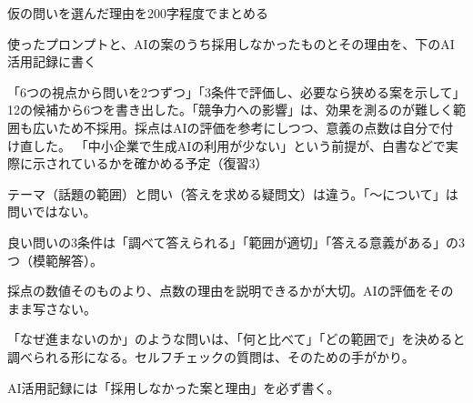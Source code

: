 \begin{nexttime}
  \item 仮の問いを選んだ理由を200字程度でまとめる
  \item 使ったプロンプトと、AIの案のうち採用しなかったものとその理由を、下のAI活用記録に書く
\end{nexttime}
{「6つの視点から問いを2つずつ」「3条件で評価し、必要なら狭める案を示して」}
{12の候補から6つを書き出した。「競争力への影響」は、効果を測るのが難しく範囲も広いため不採用。採点はAIの評価を参考にしつつ、意義の点数は自分で付け直した。}
{「中小企業で生成AIの利用が少ない」という前提が、白書などで実際に示されているかを確かめる予定（復習3）}

\begin{point}
  \item テーマ（話題の範囲）と問い（答えを求める疑問文）は違う。「〜について」は問いではない。
  \item 良い問いの3条件は「調べて答えられる」「範囲が適切」「答える意義がある」の3つ（模範解答）。
  \item 採点の数値そのものより、点数の理由を説明できるかが大切。AIの評価をそのまま写さない。
  \item 「なぜ進まないのか」のような問いは、「何と比べて」「どの範囲で」を決めると調べられる形になる。セルフチェックの質問は、そのための手がかり。
  \item AI活用記録には「採用しなかった案と理由」を必ず書く。
\end{point}
